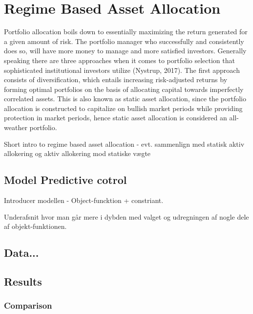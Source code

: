 \newpage

\section{Regime Based Asset Allocation}
Portfolio allocation boils down to essentially maximizing the return generated for a given amount of risk. The portfolio manager who successfully and consistently does so, will have more money to manage and more satisfied investors. Generally speaking there are three approaches when it comes to portfolio selection that sophisticated institutional investors utilize (Nystrup, 2017). The first approach consists of diversification, which entails increasing risk-adjusted returns by forming optimal portfolios on the basis of allocating capital towards imperfectly correlated assets. This is also known as static asset allocation, since the portfolio allocation is constructed to capitalize on bullish market periods while providing protection in market periods, hence static asset allocation is considered an all-weather portfolio. 


Short intro to regime based asset allocation - evt. sammenlign med statisk aktiv allokering og aktiv allokering mod statiske vægte

\subsection{Model Predictive cotrol}



Introducer modellen
- Object-funcktion + constriant.

Underafsnit hvor man går mere i dybden med valget og udregningen af nogle dele af objekt-funktionen.

\subsection{Data...}


\subsection{Results}




\subsubsection{Comparison}
